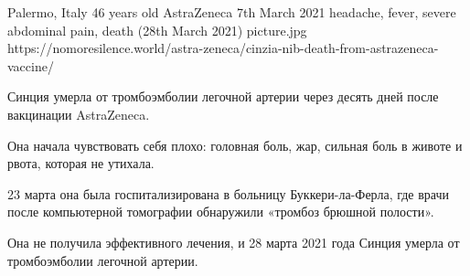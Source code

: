 {Palermo, Italy}
{46 years old}
{AstraZeneca}
{7th March 2021}
{headache, fever, severe abdominal pain, death (28th March 2021)}
{picture.jpg}
{https://nomoresilence.world/astra-zeneca/cinzia-nib-death-from-astrazeneca-vaccine/}
{

Синция умерла от тромбоэмболии легочной артерии через десять дней после
вакцинации AstraZeneca.

Она начала чувствовать себя плохо: головная боль, жар, сильная боль в животе и
рвота, которая не утихала.

23 марта она была госпитализирована в больницу Буккери-ла-Ферла, где врачи после
компьютерной томографии обнаружили «тромбоз брюшной полости».

Она не получила эффективного лечения, и 28 марта 2021 года Синция умерла от
тромбоэмболии легочной артерии.

}
